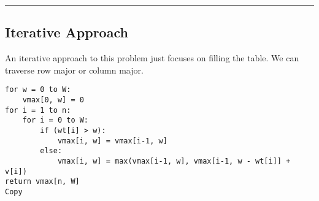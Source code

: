 \documentclass[
]{article}
\begin{document}
\begin{center}\rule{0.5\linewidth}{0.5pt}\end{center}

\hypertarget{iterative-approach}{%
\subsection{Iterative Approach}\label{iterative-approach}}

An iterative approach to this problem just focuses on filling the table.
We can traverse row major or column major.

\begin{verbatim}
for w = 0 to W:
    vmax[0, w] = 0
for i = 1 to n:
    for i = 0 to W:
        if (wt[i] > w):
            vmax[i, w] = vmax[i-1, w]
        else:
            vmax[i, w] = max(vmax[i-1, w], vmax[i-1, w - wt[i]] + v[i])
return vmax[n, W]
Copy
\end{verbatim}
\end{document}
